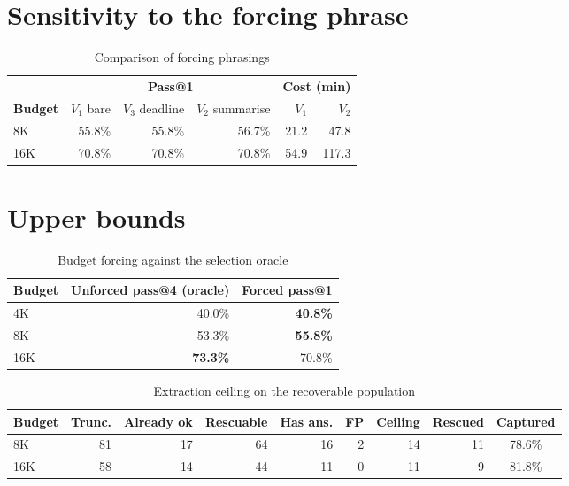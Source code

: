 \documentclass[12pt,a4paper,oneside]{report}
\newif\ifdraft
\newcommand{\writehere}[2]{%
  \ifdraft
    \begin{tcolorbox}[colback=yellow!8,colframe=orange!55,
                      boxrule=0.6pt,left=6pt,right=6pt,top=4pt,bottom=4pt]
    {\small\textbf{WRITE: #1}\\[2pt]#2}
    \end{tcolorbox}
  \fi}
\begin{document}
\section{Sensitivity to the forcing phrase}

\begin{table}[htbp]
\centering
\caption{Comparison of forcing phrasings}
\label{tab:variants}
\small
\begin{tabular}{@{}lrrr@{\hspace{2em}}rr@{}}
\toprule
& \multicolumn{3}{c}{\textbf{Pass@1}} & \multicolumn{2}{c}{\textbf{Cost (min)}} \\
\cmidrule(lr){2-4}\cmidrule(l){5-6}
\textbf{Budget} & $V_1$ bare & $V_3$ deadline & $V_2$ summarise &
$V_1$ & $V_2$ \\
\midrule
8K  & 55.8\% & 55.8\% & 56.7\% & 21.2 & 47.8 \\
16K & 70.8\% & 70.8\% & 70.8\% & 54.9 & 117.3 \\
\bottomrule
\end{tabular}
\end{table}

\writehere{1 paragraph, factual}{
Identical at 16K. The 0.9 point lead at 8K is one sample out of 120. $V_2$ costs
2.1 times more compute at both budgets.}

\section{Upper bounds}

\begin{table}[htbp]
\centering
\caption{Budget forcing against the selection oracle}
\label{tab:oracle}
\small
\begin{tabular}{@{}lrr@{}}
\toprule
\textbf{Budget} & \textbf{Unforced pass@4 (oracle)} & \textbf{Forced pass@1} \\
\midrule
4K  & 40.0\% & \textbf{40.8\%} \\
8K  & 53.3\% & \textbf{55.8\%} \\
16K & \textbf{73.3\%} & 70.8\% \\
\bottomrule
\end{tabular}
\end{table}

\begin{table}[htbp]
\centering
\caption{Extraction ceiling on the recoverable population}
\label{tab:ceiling}
\small
\begin{tabular}{@{}lrrrrrrrc@{}}
\toprule
\textbf{Budget} & \textbf{Trunc.} & \textbf{Already ok} & \textbf{Rescuable} &
\textbf{Has ans.} & \textbf{FP} & \textbf{Ceiling} & \textbf{Rescued} &
\textbf{Captured} \\
\midrule
8K  & 81 & 17 & 64 & 16 & 2 & 14 & 11 & 78.6\% \\
16K & 58 & 14 & 44 & 11 & 0 & 11 &  9 & 81.8\% \\
\bottomrule
\end{tabular}
\end{table}
\end{document}
